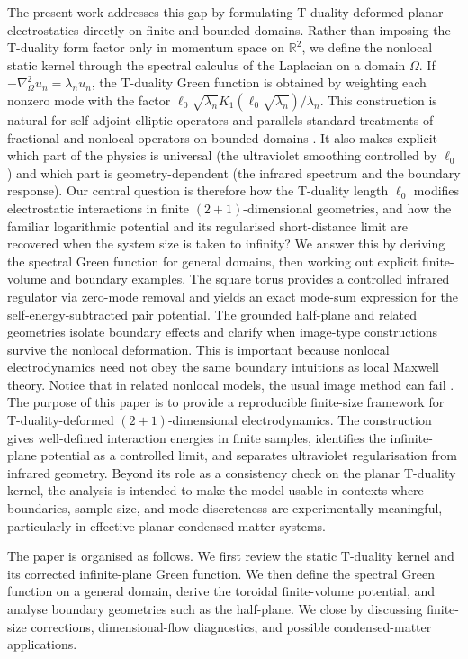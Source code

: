\documentclass[nopacs,amsmath,amsfonts,amssymb,aps,superscriptaddress]{revtex4}
\begin{document}
The present work addresses this gap by formulating T-duality-deformed planar electrostatics directly on finite and bounded domains. Rather than imposing the T-duality form factor only in momentum space on $\mathbb{R}^2$, we define the nonlocal static kernel through the spectral calculus of the Laplacian on a domain $\Omega$. If $-\nabla_\Omega^2 u_n=\lambda_n u_n$, the T-duality Green function is obtained by weighting each nonzero mode with the factor $\ell_0\sqrt{\lambda_n}K_1(\ell_0\sqrt{\lambda_n})/\lambda_n$. This construction is natural for self-adjoint elliptic operators and parallels standard treatments of fractional and nonlocal operators on bounded domains \cite{CaffarelliSilvestre2007, BonitoPasciak2015}. It also makes explicit which part of the physics is universal (the ultraviolet smoothing controlled by $\ell_0$) and which part is geometry-dependent (the infrared spectrum and the boundary response). Our central question is therefore how the T-duality length $\ell_0$ modifies electrostatic interactions in finite $(2+1)$-dimensional geometries, and how the familiar logarithmic potential and its regularised short-distance limit are recovered when the system size is taken to infinity? We answer this by deriving the spectral Green function for general domains, then working out explicit finite-volume and boundary examples. The square torus provides a controlled infrared regulator via zero-mode removal and yields an exact mode-sum expression for the self-energy-subtracted pair potential. The grounded half-plane and related geometries isolate boundary effects and clarify when image-type constructions survive the nonlocal deformation. This is important because nonlocal electrodynamics need not obey the same boundary intuitions as local Maxwell theory. Notice that in related nonlocal models, the usual image method can fail \cite{BorgesBufalo2025}. The purpose of this paper is to provide a reproducible finite-size framework for T-duality-deformed $(2+1)$-dimensional electrodynamics. The construction gives well-defined interaction energies in finite samples, identifies the infinite-plane potential as a controlled limit, and separates ultraviolet regularisation from infrared geometry. Beyond its role as a consistency check on the planar T-duality kernel, the analysis is intended to make the model usable in contexts where boundaries, sample size, and mode discreteness are experimentally meaningful, particularly in effective planar condensed matter systems.

The paper is organised as follows. We first review the static T-duality kernel and its corrected infinite-plane Green function. We then define the spectral Green function on a general domain, derive the toroidal finite-volume potential, and analyse boundary geometries such as the half-plane. We close by discussing finite-size corrections, dimensional-flow diagnostics, and possible condensed-matter applications.
\end{document}
